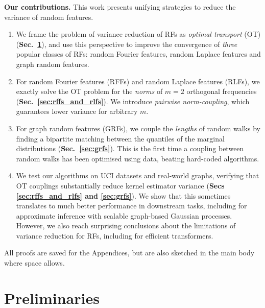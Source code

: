 \documentclass{article}
\newcommand{\pg}[1]{{\bf #1.}}
\begin{document}
\pg{Our contributions}
This work presents unifying strategies to reduce the variance of random features.
\vspace{-4.25mm}
\begin{enumerate}
    \item We frame the problem of variance reduction of RFs as \emph{optimal transport} (OT) (\textbf{Sec.~\ref{sec:background}}), and use this perspective to improve the convergence of \emph{three} popular classes of RFs: random Fourier features, random Laplace features and graph random features. 
    \item For random Fourier features (RFFs) and random Laplace features (RLFs), we exactly solve the OT problem for the \emph{norms} of $m=2$ orthogonal frequencies (\textbf{Sec.~\ref{sec:rffs_and_rlfs}}). 
    We introduce \emph{pairwise norm-coupling}, which guarantees lower variance for arbitrary $m$.
    \item For graph random features (GRFs), we couple the \emph{lengths} of random walks by finding a bipartite matching between the quantiles of the marginal distributions (\textbf{Sec.~\ref{sec:grfs}}). 
    This is the first time a coupling between random walks has been optimised using data, beating hard-coded algorithms.
    \item We test our algorithms on UCI datasets and real-world graphs, verifying that OT couplings substantially reduce kernel estimator variance (\textbf{Secs \ref{sec:rffs_and_rlfs} and \ref{sec:grfs}}).
    We show that this sometimes translates to much better performance in downstream tasks, including for approximate inference with scalable graph-based Gaussian processes. %
    However, we also reach surprising conclusions about the limitations of variance reduction for RFs, including for efficient transformers. 
\end{enumerate}
\vspace{-0.25mm}All proofs are saved for the Appendices, but are also sketched in the main body where space allows.

\vspace{-3mm}
\section{Preliminaries}  \label{sec:background}\vspace{-2mm}

\end{document}
